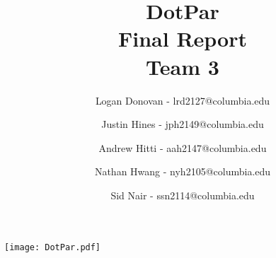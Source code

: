 \begin{titlepage}


\title{DotPar \\ Final Report \\ Team 3}
\author{
Logan Donovan - lrd2127@columbia.edu \and
Justin Hines - jph2149@columbia.edu \and
Andrew Hitti - aah2147@columbia.edu \and
Nathan Hwang - nyh2105@columbia.edu \and
Sid Nair - ssn2114@columbia.edu}
\maketitle

\begin{center}
\texttt{[image: DotPar.pdf]} 
\end{center}

\end{titlepage}